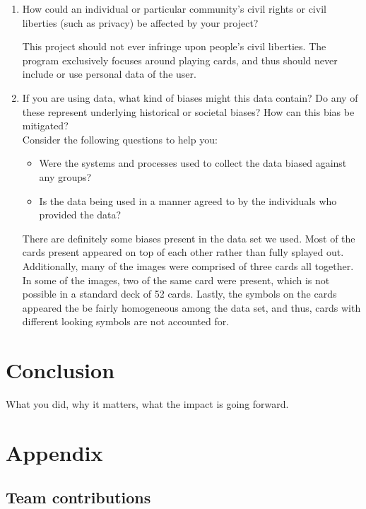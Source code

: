 \documentclass[10pt,twocolumn,letterpaper]{article}
\begin{document}
\begin{enumerate}
\item How could an individual or particular community’s civil rights or civil liberties (such as privacy) be affected by your project?

This project should not ever infringe upon people's civil liberties. The program exclusively focuses around playing cards, and thus should never include or use personal data of the user. 


\item If you are using data, what kind of biases might this data contain? Do any of these represent underlying historical or societal biases? How can this bias be mitigated? \\
    Consider the following questions to help you:
    \begin{itemize}
    \item Were the systems and processes used to collect the data biased against any groups?
    \item Is the data being used in a manner agreed to by the individuals who provided the data?
    \end{itemize}
    
There are definitely some biases present in the data set we used. Most of the cards present appeared on top of each other rather than fully splayed out. Additionally, many of the images were comprised of three cards all together. In some of the images, two of the same card were present, which is not possible in a standard deck of 52 cards. Lastly, the symbols on the cards appeared the be fairly homogeneous among the data set, and thus, cards with different looking symbols are not accounted for. 

\end{enumerate}

\section{Conclusion}

What you did, why it matters, what the impact is going forward.

{\small


}

\section*{Appendix}

\subsection*{Team contributions}
\end{document}
